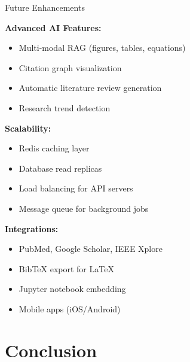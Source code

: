 \documentclass{beamer}
\begin{document}
\begin{frame}{Future Enhancements}

\textbf{Advanced AI Features:}
\begin{itemize}
    \item Multi-modal RAG (figures, tables, equations)
    \item Citation graph visualization
    \item Automatic literature review generation
    \item Research trend detection
\end{itemize}

\vspace{0.2cm}

\textbf{Scalability:}
\begin{itemize}
    \item Redis caching layer
    \item Database read replicas
    \item Load balancing for API servers
    \item Message queue for background jobs
\end{itemize}

\vspace{0.2cm}

\textbf{Integrations:}
\begin{itemize}
    \item PubMed, Google Scholar, IEEE Xplore
    \item BibTeX export for LaTeX
    \item Jupyter notebook embedding
    \item Mobile apps (iOS/Android)
\end{itemize}

\end{frame}


\section{Conclusion}
\end{document}
